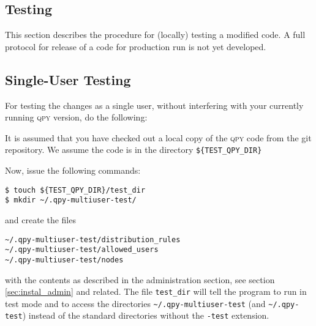 \documentclass[a4paper,12pt]{article}
\newcommand{\qpy}{\textsc{qpy}}
\begin{document}
\begin{center}
\end{center}

\linespread{1.5}


\subsection{Testing}

This section describes the procedure for (locally) testing a modified code. A full protocol for release of a code for production run is not yet developed.

\subsection{Single-User Testing}

For testing the changes as a single user, without interfering with your currently running \qpy{} version, do the following:

It is assumed that you have checked out a local copy of the \qpy{} code from the git repository. We assume the code is in the directory \verb+${TEST_QPY_DIR}+

Now, issue the following commands:
\begin{lstlisting}[style=BashStyle]
$ touch ${TEST_QPY_DIR}/test_dir
$ mkdir ~/.qpy-multiuser-test/
\end{lstlisting}
and create the files
\begin{verbatim}
~/.qpy-multiuser-test/distribution_rules
~/.qpy-multiuser-test/allowed_users
~/.qpy-multiuser-test/nodes
\end{verbatim}
with the contents as described in the administration section, see section \ref{sec:instal_admin} and related. The file \verb+test_dir+ will tell the program to run in test mode and to access the directories \verb+~/.qpy-multiuser-test+ (and \verb+~/.qpy-test+) instead of the standard directories without the \verb+-test+ extension.
\end{document}

